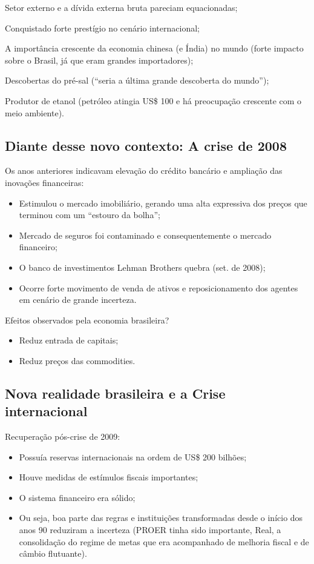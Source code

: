 \documentclass[a4paper,12pt]{article}[abntex2]
\begin{document}
Setor externo e a dívida externa bruta pareciam equacionadas;

Conquistado forte prestígio no cenário internacional;

A importância crescente da economia chinesa (e Índia) no mundo (forte impacto sobre o Brasil, já que eram grandes importadores);

Descobertas do pré-sal (``seria a última grande descoberta do mundo'');

Produtor de etanol (petróleo atingia US\$ 100 e há preocupação crescente com o meio ambiente).

\subsection{\textbf{Diante desse novo contexto: A crise de 2008}}
Os anos anteriores indicavam elevação do crédito bancário e ampliação das inovações financeiras:
\begin{itemize}
    \item Estimulou o mercado imobiliário, gerando uma alta expressiva dos preços que terminou com um ``estouro da bolha'';
    \item Mercado de seguros foi contaminado e consequentemente o mercado financeiro;
    \item O banco de investimentos Lehman Brothers quebra (set. de 2008);
    \item Ocorre forte movimento de venda de ativos e reposicionamento dos agentes em cenário de grande incerteza.
\end{itemize}

Efeitos observados pela economia brasileira?
\begin{itemize}
    \item Reduz entrada de capitais;
    \item Reduz preços das commodities.
\end{itemize}

\subsection{\textbf{Nova realidade brasileira e a Crise internacional}}
Recuperação pós-crise de 2009:
\begin{itemize}
    \item Possuía reservas internacionais na ordem de US\$ 200 bilhões;
    \item Houve medidas de estímulos fiscais importantes;
    \item O sistema financeiro era sólido;
    \item Ou seja, boa parte das regras e instituições transformadas desde o início dos anos 90 reduziram a incerteza 
    (PROER tinha sido importante, Real, a consolidação do regime de metas que era acompanhado de melhoria fiscal e de câmbio flutuante).
\end{itemize}
\end{document}
